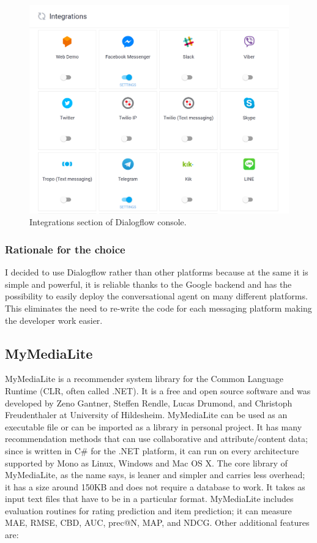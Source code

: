 \documentclass[b5paper,10pt,twoside,cucitura]{toptesi}
\begin{document}
\begin{figure}[ht]
\centering
\includegraphics[scale=0.53]{dialogflow_integrations.png}
\caption{Integrations section of Dialogflow console.}
\end{figure}

\subsubsection{Rationale for the choice}
I decided to use Dialogflow rather than other platforms because at the same it is simple and powerful, it is reliable thanks to the Google backend and has the possibility to easily deploy the conversational agent on many different platforms. This eliminates the need to re-write the code for each messaging platform making the developer work easier.


\subsection{MyMediaLite}

MyMediaLite is a recommender system library for the Common Language Runtime (CLR, often called .NET). It is a free and open source software and was developed by Zeno Gantner, Steffen Rendle, Lucas Drumond, and Christoph Freudenthaler at University of Hildesheim.
MyMediaLite can be used as an executable file or can be imported as a library in personal project. It has many recommendation methods that can use collaborative and attribute/content data; since is written in C{\#} for the .NET platform, it can run on every architecture supported by Mono as Linux, Windows and Mac OS X. The core library of MyMediaLite, as the name says, is leaner and simpler and carries less overhead; it has a size around 150KB and does not require a database to work. It takes as input text files that have to be in a particular format.
MyMediaLite includes evaluation routines for rating prediction and item prediction; it can measure MAE, RMSE, CBD, AUC, prec@N, MAP, and NDCG. Other additional features are:
\end{document}
